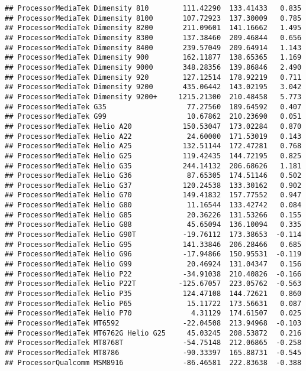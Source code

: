 \documentclass[
]{article}
\begin{document}
\begin{verbatim}
## ProcessorMediaTek Dimensity 810        111.42290  133.41433   0.835
## ProcessorMediaTek Dimensity 8100       107.72923  137.30009   0.785
## ProcessorMediaTek Dimensity 8200       211.09601  141.16662   1.495
## ProcessorMediaTek Dimensity 8300       137.38460  209.46844   0.656
## ProcessorMediaTek Dimensity 8400       239.57049  209.64914   1.143
## ProcessorMediaTek Dimensity 900        162.11877  138.65365   1.169
## ProcessorMediaTek Dimensity 9000       348.28356  139.86846   2.490
## ProcessorMediaTek Dimensity 920        127.12514  178.92219   0.711
## ProcessorMediaTek Dimensity 9200       435.06442  143.02195   3.042
## ProcessorMediaTek Dimensity 9200+     1215.21300  210.48458   5.773
## ProcessorMediaTek G35                   77.27560  189.64592   0.407
## ProcessorMediaTek G99                   10.67862  210.23690   0.051
## ProcessorMediaTek Helio A20            150.53047  173.02284   0.870
## ProcessorMediaTek Helio A22             24.60000  171.53019   0.143
## ProcessorMediaTek Helio A25            132.51144  172.47281   0.768
## ProcessorMediaTek Helio G25            119.42435  144.72195   0.825
## ProcessorMediaTek Helio G35            244.14132  206.68626   1.181
## ProcessorMediaTek Helio G36             87.65305  174.51146   0.502
## ProcessorMediaTek Helio G37            120.24538  133.30162   0.902
## ProcessorMediaTek Helio G70            149.41832  157.77552   0.947
## ProcessorMediaTek Helio G80             11.16544  133.42742   0.084
## ProcessorMediaTek Helio G85             20.36226  131.53266   0.155
## ProcessorMediaTek Helio G88             45.65094  136.10094   0.335
## ProcessorMediaTek Helio G90T           -19.76112  173.38653  -0.114
## ProcessorMediaTek Helio G95            141.33846  206.28466   0.685
## ProcessorMediaTek Helio G96            -17.94866  150.95531  -0.119
## ProcessorMediaTek Helio G99             20.46924  131.04347   0.156
## ProcessorMediaTek Helio P22            -34.91038  210.40826  -0.166
## ProcessorMediaTek Helio P22T          -125.67057  223.05762  -0.563
## ProcessorMediaTek Helio P35            124.47108  144.72621   0.860
## ProcessorMediaTek Helio P65             15.11722  173.56631   0.087
## ProcessorMediaTek Helio P70              4.31129  174.61507   0.025
## ProcessorMediaTek MT6592               -22.04508  213.94968  -0.103
## ProcessorMediaTek MT6762G Helio G25     45.03245  208.53872   0.216
## ProcessorMediaTek MT8768T              -54.75148  212.06865  -0.258
## ProcessorMediaTek MT8786               -90.33397  165.88731  -0.545
## ProcessorQualcomm MSM8916              -86.46581  222.83638  -0.388

\end{verbatim}
\end{document}
